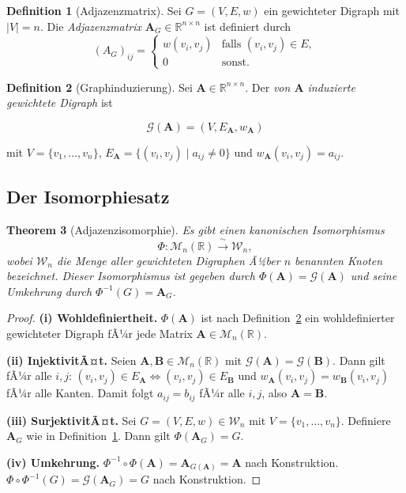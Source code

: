 ﻿\documentclass[12pt, a4paper]{article}
\newtheorem{theorem}{Theorem}[section]
\theoremstyle{definition}
\newtheorem{definition}[theorem]{Definition}
\theoremstyle{remark}
\newcommand{\R}{\mathbb{R}}
\newcommand{\vA}{\bm{A}}
\newcommand{\vB}{\bm{B}}
\begin{document}
\begin{definition}[Adjazenzmatrix]
\label{def:adj}
Sei $G = (V, E, w)$ ein gewichteter Digraph mit $|V| = n$. Die
\emph{Adjazenzmatrix} $\vA_G \in \R^{n \times n}$ ist definiert durch
\[
  (A_G)_{ij} =
  \begin{cases}
    w(v_i, v_j) & \text{falls } (v_i, v_j) \in E, \\
    0 & \text{sonst.}
  \end{cases}
\]
\end{definition}

\begin{definition}[Graphinduzierung]
\label{def:graph_induktion}
Sei $\vA \in \R^{n \times n}$. Der \emph{von $\vA$ induzierte gewichtete
Digraph} ist

\begin{equation}
  \mathcal{G}(\vA) = (V, E_{\vA}, w_{\vA})
\end{equation}

mit $V = \{v_1,\ldots,v_n\}$, $E_{\vA} = \{(v_i, v_j) \mid a_{ij} \neq 0\}$ und $w_{\vA}(v_i, v_j) = a_{ij}$.
\end{definition}

\subsection{Der Isomorphiesatz}
\label{subsec:iso}

\begin{theorem}[Adjazenzisomorphie]
\label{thm:iso}
Es gibt einen kanonischen Isomorphismus
\[
  \Phi: \mathcal{M}_n(\R) \xrightarrow{\;\sim\;} \mathcal{W}_n,
\]
wobei $\mathcal{W}_n$ die Menge aller gewichteten Digraphen Ã¼ber $n$
benannten Knoten bezeichnet. Dieser Isomorphismus ist gegeben durch
$\Phi(\vA) = \mathcal{G}(\vA)$ und seine Umkehrung durch
$\Phi^{-1}(G) = \vA_G$.
\end{theorem}

\begin{proof}
\textbf{(i) Wohldefiniertheit.} $\Phi(\vA)$ ist nach
Definition~\ref{def:graph_induktion} ein wohldefinierter gewichteter
Digraph fÃ¼r jede Matrix $\vA \in \mathcal{M}_n(\R)$.

\textbf{(ii) InjektivitÃ¤t.} Seien $\vA, \vB \in \mathcal{M}_n(\R)$ mit
$\mathcal{G}(\vA) = \mathcal{G}(\vB)$. Dann gilt fÃ¼r alle $i,j$:
$(v_i,v_j) \in E_{\vA} \Leftrightarrow (v_i,v_j) \in E_{\vB}$ und
$w_{\vA}(v_i,v_j) = w_{\vB}(v_i,v_j)$ fÃ¼r alle Kanten. Damit folgt
$a_{ij} = b_{ij}$ fÃ¼r alle $i,j$, also $\vA = \vB$.

\textbf{(iii) SurjektivitÃ¤t.} Sei $G = (V,E,w) \in \mathcal{W}_n$
mit $V = \{v_1,\ldots,v_n\}$. Definiere $\vA_G$ wie in
Definition~\ref{def:adj}. Dann gilt $\Phi(\vA_G) = G$.

\textbf{(iv) Umkehrung.} $\Phi^{-1} \circ \Phi(\vA) = \vA_{G(\vA)} = \vA$
nach Konstruktion. $\Phi \circ \Phi^{-1}(G) = \mathcal{G}(\vA_G) = G$
nach Konstruktion.
\end{proof}
\end{document}

